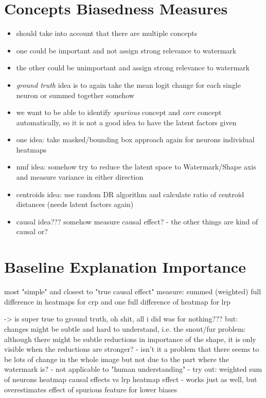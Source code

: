 \section{Concepts Biasedness Measures}
\begin{itemize}
    \item should take into account that there are multiple concepts
    \item one could be important and not assign strong relevance to watermark
    \item the other could be unimportant and assign strong relevance to watermark
    \item \textit{ground truth} idea is to again take the mean logit change for each single neuron or summed together somehow
    \item we want to be able to identify \textit{spurious} concept and \textit{core} concept automatically, so it is not a good idea to have the latent factors given
    \item one idea: take masked/bounding box approach again for neurons individual heatmaps
    \item nmf idea: somehow try to reduce the latent space to Watermark/Shape axis and measure variance in either direction
    \item centroids idea: use random DR algorithm and calculate ratio of centroid distances (needs latent factors again)
    \item causal idea??? somehow measure causal effect? - the other things are kind of causal or?
\end{itemize}



\section{Baseline Explanation Importance}
most "simple" and closest to "true causal effect" measure:
summed (weighted) full difference in heatmaps for crp and one full difference of heatmap for lrp

-> is super true to ground truth, oh shit, all i did was for nothing???
but: changes might be subtle and hard to understand, i.e. the snout/fur problem: although there might be subtle reductions in importance of the shape, it is only visible when the reductions are stronger? 
- isn't it a problem that there seems to be lots of change in the whole image but not due to the part where the watermark is? 
- not applicable to "human understanding"
- try out: weighted sum of neurons heatmap causal effects vs lrp heatmap effect 
- works just as well, but overestimates effect of spurious feature for lower biases



